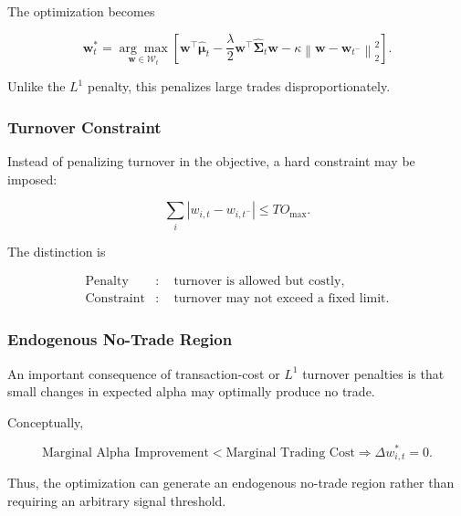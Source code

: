 \documentclass[11pt,a4paper]{article}
\begin{document}
The optimization becomes

\begin{equation}
\mathbf{w}_t^{*}
=
\underset{\mathbf{w}\in\mathcal{W}_t}{\arg\max}
\left[
\mathbf{w}^{\top}
\widehat{\boldsymbol{\mu}}_t
-
\frac{\lambda}{2}
\mathbf{w}^{\top}
\widehat{\boldsymbol{\Sigma}}_t
\mathbf{w}
-
\kappa
\left\|
\mathbf{w}
-
\mathbf{w}_{t^-}
\right\|_2^2
\right].
\end{equation}

Unlike the $L^1$ penalty, this penalizes large trades disproportionately.


\subsubsection{Turnover Constraint}

Instead of penalizing turnover in the objective, a hard constraint may be
imposed:

\begin{equation}
\boxed{
\sum_i
|w_{i,t}-w_{i,t^-}|
\leq
TO_{\max}.
}
\end{equation}

The distinction is

\begin{equation}
\boxed{
\begin{aligned}
\text{Penalty}
&:
\quad
\text{turnover is allowed but costly},
\\
\text{Constraint}
&:
\quad
\text{turnover may not exceed a fixed limit}.
\end{aligned}
}
\end{equation}


\subsubsection{Endogenous No-Trade Region}

An important consequence of transaction-cost or $L^1$ turnover penalties is
that small changes in expected alpha may optimally produce no trade.

Conceptually,

\begin{equation}
\boxed{
\text{Marginal Alpha Improvement}
<
\text{Marginal Trading Cost}
\Rightarrow
\Delta w_{i,t}^{*}=0.
}
\end{equation}

Thus, the optimization can generate an endogenous no-trade region rather than
requiring an arbitrary signal threshold.


\end{document}
